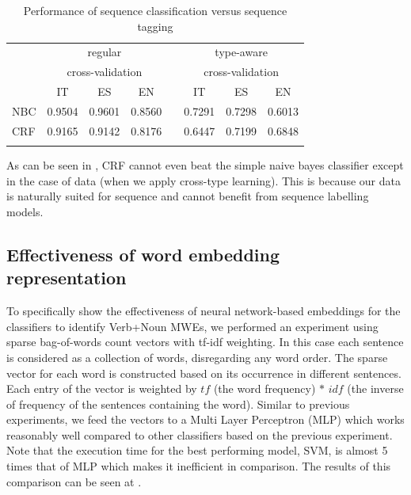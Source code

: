 \documentclass[output=paper,modfonts,nonflat]{langsci/langscibook}
\begin{document}
\begin{table}[!ht]
\small
\caption{Performance of sequence classification versus sequence tagging}
\label{tab:seqLabel}
 \begin{tabular}{lccccccc} 
  \lsptoprule

   & \multicolumn{3}{c}{regular}  & & \multicolumn{3}{c}{type-aware %
   } \\
   & \multicolumn{3}{c}{cross-validation} & & \multicolumn{3}{c}{cross-validation} \\
   \midrule
   & IT & ES & EN & & IT & ES & EN \\
 NBC  &  0.9504 & 0.9601 & 0.8560 & & 0.7291 & 0.7298 & 0.6013 \\
 CRF  &  0.9165 & 0.9142 & 0.8176 & & 0.6447 & 0.7199 & 0.6848 \\
  \lspbottomrule
 \end{tabular}
\end{table}

As can be seen in , CRF cannot even beat the simple naive bayes classifier except in the case of  data (when we apply cross-type learning). This is because our data is naturally suited for sequence  and cannot benefit from sequence labelling models.

\subsection{Effectiveness of word embedding representation}
\label{s:wv-res}
To specifically show the effectiveness of neural network-based embeddings for the classifiers to identify Verb+Noun MWEs, we performed an experiment using sparse bag-of-words count vectors with tf-idf weighting. In this case each sentence is considered as a collection of words, disregarding any word order. The sparse vector for each word is constructed based on its occurrence in different sentences. Each entry of the vector is weighted by $tf$ (the word frequency) $*$ $idf$ (the inverse of frequency of the sentences containing the word). Similar to previous experiments, we feed the vectors to a Multi Layer Perceptron (MLP) which works reasonably well compared to other classifiers based on the previous experiment. Note that the execution time for the best performing model, SVM, is almost 5 times that of MLP which makes it inefficient in comparison. The results of this comparison can be seen at .
\end{document}

